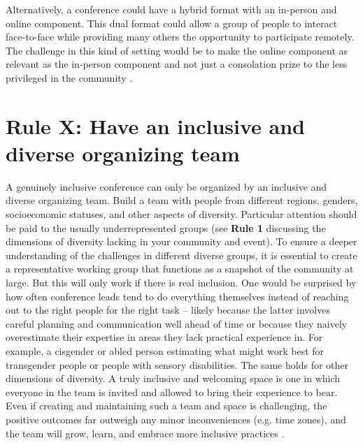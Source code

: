 \documentclass[10pt,letterpaper]{article}
\begin{document}
Alternatively, a conference could have a hybrid format with an in-person and online component. This dual format could allow a group of people to interact face-to-face while providing many others the opportunity to participate remotely. The challenge in this kind of setting would be to make the online component as relevant as the in-person component and not just a consolation prize to the less privileged in the community \cite{niner_better_2021}. 


\section{Rule X: Have an inclusive and diverse organizing team}
\label{rule_organizing_team}
A genuinely inclusive conference can only be organized by an inclusive and diverse organizing team. Build a team with people from different regions, genders, socioeconomic statuses, and other aspects of diversity. Particular attention should be paid to the usually underrepresented groups (see \textbf{Rule 1} discussing the dimensions of diversity lacking in your community and event). To ensure a deeper understanding of the challenges in different diverse groups, it is essential to create a representative working group that functions as a snapshot of the community at large. But this will only work if there is real inclusion. One would be surprised by how often conference leads tend to do everything themselves instead of reaching out to the right people for the right task -- likely because the latter involves careful planning and communication well ahead of time or because they naively overestimate their expertise in areas they lack practical experience in. For example, a cisgender or abled person estimating what might work best for transgender people or people with sensory disabilities. The same holds for other dimensions of diversity. A truly inclusive and welcoming space is one in which everyone in the team is invited and allowed to bring their experience to bear. Even if creating and maintaining such a team and space is challenging, the positive outcomes far outweigh any minor inconveniences (e.g. time zones), and the team will grow, learn, and embrace more inclusive practices \cite{hong_groups_2004}. 

\end{document}
